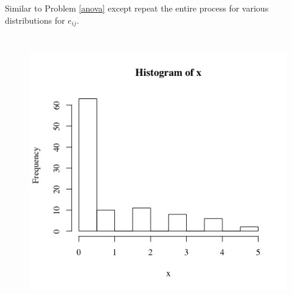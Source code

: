\documentclass[11pt]{article}
\begin{document}
\subsection{}

Similar to Problem \ref{anova} except repeat the entire process for various distributions for $e_{ij}$.

\section{}

\subsection{}

\begin{figure}[h!]
\begin{center}
\includegraphics[height=0.3\textheight,width=0.45\linewidth]{plot5-a}
\end{center}
\label{initial}
\end{figure}

\subsection{}

\subsubsection{}
\end{document}
